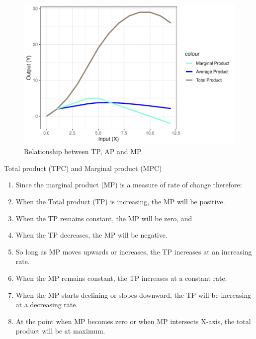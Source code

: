 \documentclass[12pt,ignorenonframetext,aspectratio=169]{beamer}
\providecommand{\tightlist}{%
  \setlength{\itemsep}{0pt}\setlength{\parskip}{0pt}}
\begin{document}
\begin{frame}{}
\protect\hypertarget{section-10}{}
\begin{figure}
\includegraphics[width=0.7\linewidth]{production_relationship_files/figure-beamer/tc-ac-mc-relationship-plot-1} \caption{Relationship between TP, AP and MP.}\label{fig:tc-ac-mc-relationship-plot}
\end{figure}
\end{frame}

\begin{frame}{Total product (TPC) and Marginal product (MPC)}
\protect\hypertarget{total-product-tpc-and-marginal-product-mpc}{}
\begin{enumerate}
\tightlist
\item
  Since the marginal product (MP) is a measure of rate of change
  therefore:
\item
  When the Total product (TP) is increasing, the MP will be positive.
\item
  When the TP remains constant, the MP will be zero, and
\item
  When the TP decreases, the MP will be negative.
\item
  So long as MP moves upwards or increases, the TP increases at an
  increasing rate.
\item
  When the MP remains constant, the TP increases at a constant rate.
\item
  When the MP starts declining or slopes downward, the TP will be
  increasing at a decreasing rate.
\item
  At the point when MP becomes zero or when MP intersects X-axis, the
  total product will be at maximum.
\end{enumerate}
\end{frame}
\end{document}
